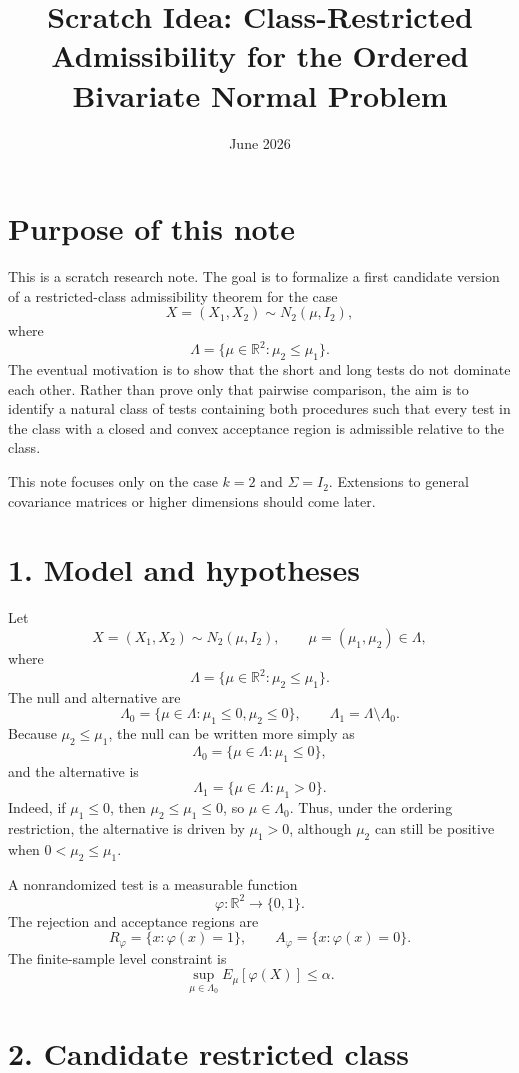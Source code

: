 \documentclass[11pt]{article}
\title{Scratch Idea: Class-Restricted Admissibility for the Ordered Bivariate Normal Problem}
\author{}
\date{June 2026}
\begin{document}
\maketitle

\section*{Purpose of this note}

This is a scratch research note. The goal is to formalize a first candidate version of a restricted-class admissibility theorem for the case
\[
X=(X_1,X_2) \sim N_2(\mu,I_2),
\]
where
\[
\Lambda=\{\mu\in\mathbb R^2:\mu_2\le \mu_1\}.
\]
The eventual motivation is to show that the short and long tests do not dominate each other. Rather than prove only that pairwise comparison, the aim is to identify a natural class of tests containing both procedures such that every test in the class with a closed and convex acceptance region is admissible relative to the class.

This note focuses only on the case \(k=2\) and \(\Sigma=I_2\). Extensions to general covariance matrices or higher dimensions should come later.

\section*{1. Model and hypotheses}

Let
\[
X=(X_1,X_2)\sim N_2(\mu,I_2),
\qquad
\mu=(\mu_1,\mu_2)\in\Lambda,
\]
where
\[
\Lambda=\{\mu\in\mathbb R^2:\mu_2\le \mu_1\}.
\]
The null and alternative are
\[
\Lambda_0=\{\mu\in\Lambda:\mu_1\le 0,\mu_2\le 0\},
\qquad
\Lambda_1=\Lambda\setminus\Lambda_0.
\]
Because \(\mu_2\le \mu_1\), the null can be written more simply as
\[
\Lambda_0=\{\mu\in\Lambda:\mu_1\le 0\},
\]
and the alternative is
\[
\Lambda_1=\{\mu\in\Lambda:\mu_1>0\}.
\]
Indeed, if \(\mu_1\le 0\), then \(\mu_2\le \mu_1\le 0\), so \(\mu\in\Lambda_0\). Thus, under the ordering restriction, the alternative is driven by \(\mu_1>0\), although \(\mu_2\) can still be positive when \(0<\mu_2\le\mu_1\).

A nonrandomized test is a measurable function
\[
\varphi:\mathbb R^2\to\{0,1\}.
\]
The rejection and acceptance regions are
\[
R_\varphi=\{x:\varphi(x)=1\},
\qquad
A_\varphi=\{x:\varphi(x)=0\}.
\]
The finite-sample level constraint is
\[
\sup_{\mu\in\Lambda_0}E_\mu[\varphi(X)]\le \alpha.
\]

\section*{2. Candidate restricted class}
\end{document}
